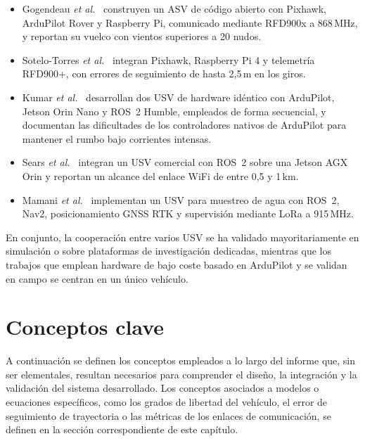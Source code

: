 \begin{itemize}
  \item Gogendeau \textit{et al.}~\cite{gogendeau2024} construyen un ASV de código
    abierto con Pixhawk, ArduPilot Rover y Raspberry Pi, comunicado mediante RFD900x a
    868\,MHz, y reportan su vuelco con vientos superiores a 20 nudos.
  \item Sotelo-Torres \textit{et al.}~\cite{sotelo2023} integran Pixhawk, Raspberry Pi 4
    y telemetría RFD900+, con errores de seguimiento de hasta 2,5\,m en los giros.
  \item Kumar \textit{et al.}~\cite{kumar2025} desarrollan dos USV de hardware idéntico
    con ArduPilot, Jetson Orin Nano y ROS~2 Humble, empleados de forma secuencial, y
    documentan las dificultades de los controladores nativos de ArduPilot para mantener
    el rumbo bajo corrientes intensas.
  \item Sears \textit{et al.}~\cite{sears2024} integran un USV comercial con ROS~2 sobre
    una Jetson AGX Orin y reportan un alcance del enlace WiFi de entre 0,5 y 1\,km.
  \item Mamani \textit{et al.}~\cite{Cite9} implementan un USV para muestreo de agua
    con ROS~2, Nav2, posicionamiento GNSS RTK y supervisión mediante LoRa a 915\,MHz.
\end{itemize}
 
En conjunto, la cooperación entre varios USV se ha validado mayoritariamente en
simulación o sobre plataformas de investigación dedicadas, mientras que los trabajos
que emplean hardware de bajo coste basado en ArduPilot y se validan en campo se centran
en un único vehículo.


\section{Conceptos clave}
\label{sec:conceptos}

A continuación se definen los conceptos empleados a lo largo del informe que, sin ser
elementales, resultan necesarios para comprender el diseño, la integración y la
validación del sistema desarrollado. Los conceptos asociados a modelos o ecuaciones
específicos, como los grados de libertad del vehículo, el error de seguimiento de
trayectoria o las métricas de los enlaces de comunicación, se definen en la sección
correspondiente de este capítulo.
 
